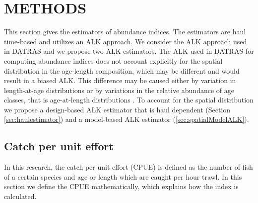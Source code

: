 \documentclass[a4paper 12pt]{article}
\numberwithin{equation}{section}
\begin{document}
\section{\large METHODS}
\label{sec:methods}
This section gives the estimators of abundance indices. The estimators are haul time-based and utilizes an ALK approach. We consider the ALK approach used in DATRAS and we propose two ALK estimators. The ALK used in DATRAS for computing abundance indices does not account explicitly for the spatial distribution in the age-length composition, which may be different and would result in a biased ALK. This difference may be caused either by variation in length-at-age distributions or by variations in the relative abundance of age classes, that is age-at-length distributions \citep{gerritsen2006simple}.  To account for the spatial distribution we propose a design-based ALK estimator that is haul dependent (Section \ref{sec:haulestimator}) and a model-based ALK estimator (\ref{sec:spatialModelALK}).
\subsection{Catch per unit effort}
\label{sec:cpueestimators}
In this research, the catch per unit effort (CPUE) is defined as the number of fish of a certain species and age or length which are caught per hour trawl. In this section we define the CPUE mathematically, which explains how the index is calculated. 
\end{document}
